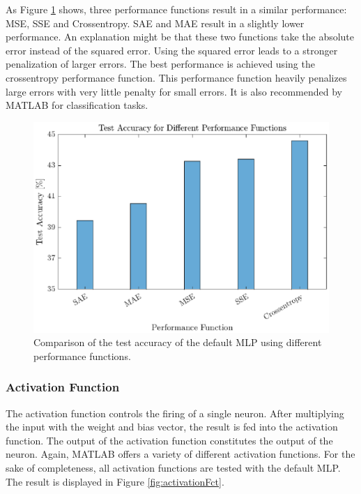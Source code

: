  As Figure \ref{fig:performFct} shows, three performance functions result in a similar performance: MSE, SSE and Crossentropy. SAE and MAE result in a slightly lower performance. An explanation might be that these two functions take the absolute error instead of the squared error. Using the squared error leads to a stronger penalization of larger errors. The best performance is achieved using the crossentropy performance function. This performance function heavily penalizes large errors with very little penalty for small errors. It is also recommended by MATLAB for classification tasks.
 
 \begin{figure}[h!]
 	\centering
 	\includegraphics{images/performFct}
 	\caption{Comparison of the test accuracy of the default MLP using different performance functions.}
 	\label{fig:performFct}
 \end{figure}

 \subsubsection{Activation Function}
 
 The activation function controls the firing of a single neuron. After multiplying the input with the weight and bias vector, the result is fed into the activation function. The output of the activation function constitutes the output of the neuron. Again, MATLAB offers a variety of different activation functions. For the sake of completeness, all activation functions are tested with the default MLP. The result is displayed in Figure \ref{fig:activationFct}.
 
